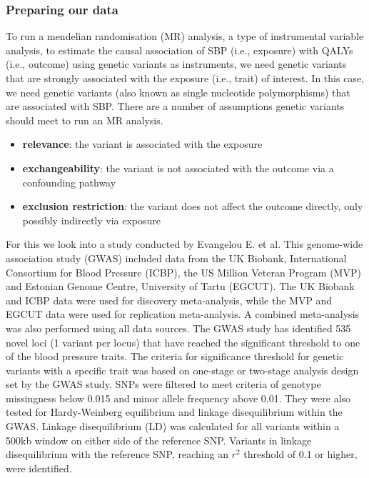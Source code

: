 \documentclass[11pt]{article}
\begin{document}
\subsubsection{Preparing our data} 
To run a mendelian randomisation (MR) analysis, a type of instrumental variable analysis, to estimate the causal association of SBP (i.e., exposure) with QALYs (i.e., outcome) using genetic variants as instruments, we need genetic variants that are strongly associated with the exposure (i.e., trait) of interest. In this case, we need genetic variants (also known as single nucleotide polymorphisms) that are associated with SBP. There are a number of assumptions genetic variants should meet to run an MR analysis\cite{lawlor2008mendelian, burgess2015mendelian, davies2018reading}.
 
\begin{itemize}
\item{\textbf{relevance}: the variant is associated with the exposure}
\item{\textbf{exchangeability}: the variant is not associated with the outcome via a confounding pathway }
\item{\textbf{exclusion restriction}: the variant does not affect the outcome directly, only possibly indirectly via exposure}
\end{itemize}
 
For this we look into a study conducted by Evangelou E. et al\cite{evangelou2018genetic}. This genome-wide association study (GWAS) included data from the UK Biobank, International Consortium for Blood Pressure (ICBP), the US Million Veteran Program (MVP) and Estonian Genome Centre, University of Tartu (EGCUT). The UK Biobank and ICBP data were used for discovery meta-analysis, while the MVP and EGCUT data were used for replication meta-analysis. A combined meta-analysis was also performed using all data sources\cite{evangelou2018genetic}. The GWAS study has identified 535 novel loci (1 variant per locus) that have reached the significant threshold to one of the blood pressure traits\cite{evangelou2018genetic}. The criteria for significance threshold for genetic variants with a specific trait was based on one-stage or two-stage analysis design set by the GWAS study\cite{evangelou2018genetic}. SNPs were filtered to meet criteria of genotype missingness below 0.015 and minor allele frequency above 0.01\cite{evangelou2018genetic}. They were also tested for Hardy-Weinberg equilibrium and linkage disequilibrium within the GWAS\cite{evangelou2018genetic}. Linkage disequilibrium (LD) was calculated for all variants within a 500kb window on either side of the reference SNP\cite{evangelou2018genetic}. Variants in linkage disequilibrium with the reference SNP, reaching an \( r^{2} \) threshold of 0.1 or higher, were identified\cite{evangelou2018genetic}.
\end{document}
